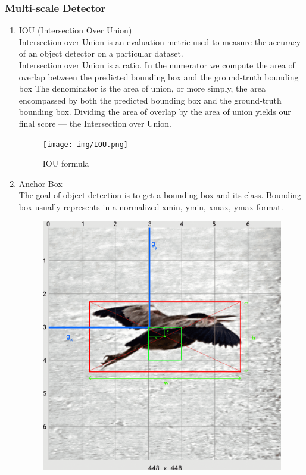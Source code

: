         \subsubsection{Multi-scale Detector}
            \begin{enumerate}
                \item IOU (Intersection Over Union) \\
                \vspace{3mm}
                Intersection over Union is an evaluation metric used to measure the accuracy of an object detector on a particular dataset. \\
                \vspace{3mm}
                Intersection over Union is a ratio. In the numerator we compute the area of overlap between the predicted bounding box and the ground-truth bounding box The denominator is the area of union, or more simply, the area encompassed by both the predicted bounding box and the ground-truth bounding box. Dividing the area of overlap by the area of union yields our final score — the Intersection over Union. \\
                \vspace{3mm}
                \begin{figure}[H]
                    \centering
                    \texttt{[image: img/IOU.png]}
                    \caption{IOU formula}
                \end{figure}
                \item Anchor Box \\
                \vspace{3mm}
                The goal of object detection is to get a bounding box and its class. Bounding box usually represents in a normalized xmin, ymin, xmax, ymax format. \\ 
                \vspace{3mm}
                \begin{figure}[H]
                    \centering
                    \includegraphics[width=0.6\linewidth]{img/bird.png}

\end{figure}
\end{enumerate}

